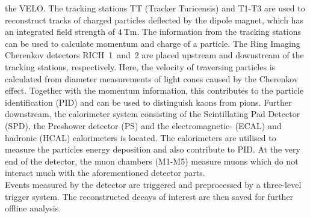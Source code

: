 the VELO. 
The tracking stations TT (Tracker Turicensis) and T1-T3 are used to reconstruct tracks of charged particles deflected by the dipole magnet, 
which has an integrated field strength of $\qty{4}{\tesla\metre}$. The information from the tracking stations can be used to calculate momentum and charge of a particle.
The Ring Imaging Cherenkov detectors RICH~1~and~2 are placed upstream and downstream of the tracking stations, respectively. 
Here, the velocity of traversing particles is calculated from diameter measurements of light cones caused by the Cherenkov effect. 
Together with the momentum information, this contributes to the particle identification (PID) and can be used to distinguish kaons from pions. 
Further downstream, the calorimeter system consisting of the Scintillating Pad Detector (SPD), the Preshower detector (PS) and the electromagnetic- (ECAL) and 
hadronic (HCAL) calorimeters is located. The calorimeters are utilised to measure the particles energy deposition and also contribute to PID.
At the very end of the detector, the muon chambers (M1-M5) measure muons which do not interact much with the aforementioned detector parts. \\
Events measured by the detector are triggered and preprocessed by a three-level trigger system. The reconstructed decays of interest are then saved for further offline 
analysis. 

